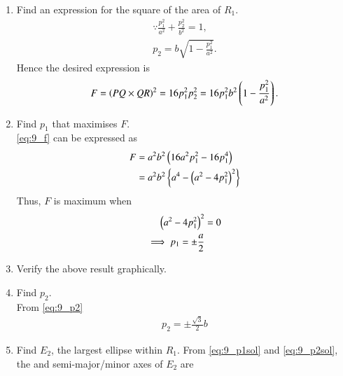 \documentclass[journal,12pt,twocolumn]{IEEEtran}
\renewcommand\thesection{\arabic{section}}
\begin{document}
\begin{enumerate}[label=\thesection.\arabic*
,ref=\thesection.\theenumi]
\begin{align}
\vec{Q} &= \vec{P}   -2\vec{m}_1^T\vec{P} \vec{m}_1
\nonumber \\
&= \myvec{-p_1 \\ p_2}
\end{align}
%
Similarly, 
\begin{align}
\vec{S} &= \vec{P}   -2\vec{m}_2^T\vec{P} \vec{m}_2
\nonumber \\
&= \myvec{p_1 \\ -p_2}
\end{align}
%
and 
\begin{align}
\vec{R} &= \vec{Q}   -2\vec{m}_2^T\vec{Q} \vec{m}_2
\nonumber \\
&= \myvec{-p_1 \\ -p_2}
\end{align}
\item Find an expression for the square of the area of $R_1$.
\\
\solution 
\begin{align}
\because \frac{p_1^2}{a^2}+\frac{p_2^2}{b^2} = 1,
\nonumber \\
p_2 = b \sqrt{1 - \frac{p_1^2}{a^2}}.
\label{eq:9_p2}
\end{align}
%
Hence the desired expression is 
\begin{align}
\label{eq:9_f}
F = \left(PQ\times QR\right)^2 = 16 p_1^2 p_2^2 = 16 p_1^2b^2 \left(1 - \frac{p_1^2}{a^2}\right).
\end{align}
%
\item Find $p_1$ that maximises $F$.
\\
\solution \eqref{eq:9_f} can be expressed as
\begin{align}
F &=  a^2b^2 \left(16 a^2p_1^2 - 16p_1^4\right)
\nonumber \\
 &=  a^2b^2 \left\{a^4-\left(a^2-4p_1^2\right)^2 \right\}
\end{align}
%
Thus, $F$ is maximum when 
\begin{align}
\left(a^2-4p_1^2\right)^2 &= 0
\nonumber \\
\implies p_1 = \pm \frac{a}{2}
\label{eq:9_p1sol}
\end{align}
\item Verify the above result graphically.
\item Find $p_2$.
\\
\solution From \eqref{eq:9_p2}
\begin{align}
 p_2 = \pm\frac{ \sqrt{3}}{2}b
\label{eq:9_p2sol}
\end{align}
%
\item Find $E_2$, the largest ellipse within $R_1$.
\solution From \eqref{eq:9_p1sol} and \eqref{eq:9_p2sol}, the  and semi-major/minor axes of $E_2$ are

\end{enumerate}
\end{document}
